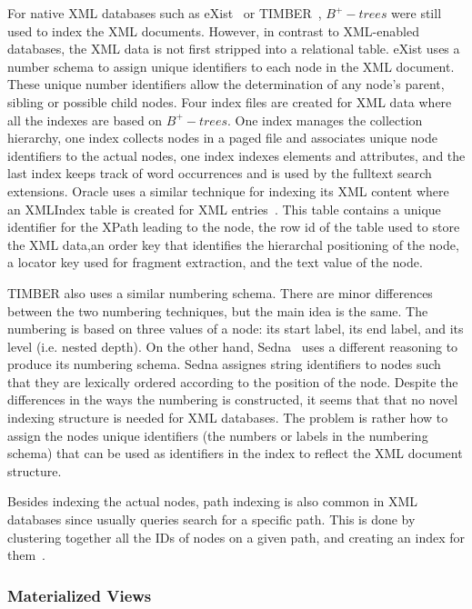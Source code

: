 \documentclass[12pt,a4paper]{article}
\begin{document}
For native XML databases such as eXist~\cite{meier2009exist} or TIMBER~\cite{jagadish2002timber}, $B^{+}-trees$ were still used to index the XML documents.
However, in contrast to XML-enabled databases, the XML data is not first stripped into a relational table. eXist uses a number schema to assign unique
identifiers to each node in the XML document. These unique number identifiers allow the determination of any node's parent, sibling or possible child nodes.
Four index files are created for XML data where all the indexes are based on $B^{+}-trees$. One index manages the collection hierarchy, one index collects nodes
in a paged file and associates unique node identifiers to the actual nodes, one index indexes elements and attributes, and the last index keeps track of word
occurrences and is used by the fulltext search extensions. Oracle uses a similar technique for indexing its XML content where an XMLIndex table is created for
XML entries~\cite{oracleXML}. This table contains a unique identifier for the XPath leading to the node, the row id of the table used to store the XML data,an
order key that identifies the hierarchal positioning of the node, a locator key used for fragment extraction, and the text value of the node.

TIMBER also uses a similar numbering schema. There are minor differences between the two numbering techniques, but the main idea is the same. The numbering is
based on three values of a node: its start label, its end label, and its level (i.e. nested depth). On the other hand, Sedna~\cite{taranov2010sedna} uses a
different reasoning to produce its numbering schema. Sedna assignes string identifiers to nodes such that they are lexically ordered according to the position
of the node. Despite the differences in the ways the numbering is constructed, it seems that that no novel indexing structure is needed for XML databases. The
problem is rather how to assign the nodes unique identifiers (the numbers or labels in the numbering schema) that can be used as identifiers in the index to
reflect the XML document structure.


Besides indexing the actual nodes, path indexing is also common in XML databases since usually queries search for a specific path. This is done by clustering
together all the IDs of nodes on a given path, and creating an index for them~\cite{milo1999index, arion2008path}.

\subsubsection{Materialized Views}
\end{document}
